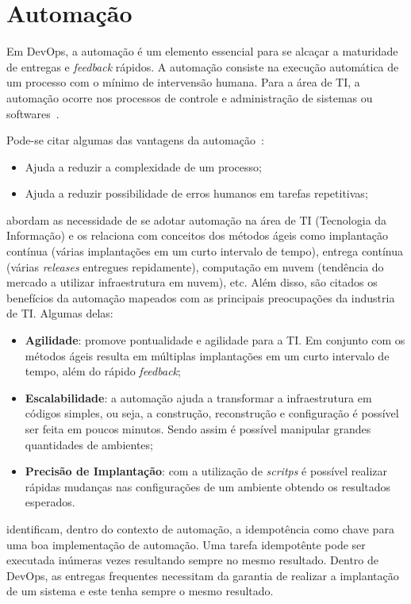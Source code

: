 \section{Automação}
\label{sec:auto}

Em DevOps, a automação é um elemento essencial para se alcaçar a maturidade
de entregas e \textit{feedback} rápidos. A automação consiste na execução
automática de um processo com o mínimo de intervensão humana. Para a área
de TI, a automação ocorre nos processos de controle e administração de
sistemas ou softwares~\cite{sharma:2015}.

Pode-se citar algumas das vantagens da automação~\cite{sharma:2015}:
\begin{itemize}
  \item Ajuda a reduzir a complexidade de um processo;
  \item Ajuda a reduzir possibilidade de erros humanos em tarefas
    repetitivas;
\end{itemize}

 abordam as necessidade de se adotar automação na área
de TI (Tecnologia da Informação) e os relaciona com conceitos dos métodos ágeis como
implantação contínua (várias implantações em um curto intervalo de tempo), entrega contínua (várias
\textit{releases} entregues repidamente), computação em nuvem (tendência do mercado a
utilizar infraestrutura em nuvem), etc. Além disso, são citados os benefícios da
automação mapeados com as principais preocupações da industria de TI. Algumas delas:

\begin{itemize}
  \item \textbf{Agilidade}: promove pontualidade e agilidade para a TI. Em conjunto
    com os métodos ágeis resulta em múltiplas implantações em um curto intervalo
    de tempo, além do rápido \textit{feedback};
  \item \textbf{Escalabilidade}: a automação ajuda a transformar a infraestrutura
    em códigos simples, ou seja, a construção, reconstrução e configuração é possível
    ser feita em poucos minutos. Sendo assim é possível manipular grandes quantidades
    de ambientes;
  \item \textbf{Precisão de Implantação}: com a utilização de \textit{scritps}
    é possível realizar rápidas mudanças nas configurações de um ambiente
    obtendo os resultados esperados.
\end{itemize}

 identificam, dentro do contexto de automação, a idempotência
como chave para uma boa implementação de automação. Uma tarefa idempotênte pode ser
executada inúmeras vezes resultando sempre no mesmo resultado. Dentro de DevOps,
as entregas frequentes necessitam da garantia de realizar a implantação de um
sistema e este tenha sempre o mesmo resultado.

